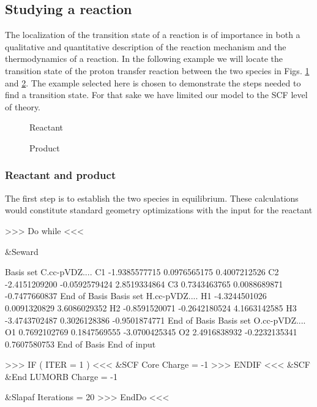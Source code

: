 \subsection{Studying a reaction}

The localization of the transition state of a reaction is of importance 
in both a qualitative and quantitative description of the reaction mechanism and
the thermodynamics of a reaction. 
In the following example we will locate the 
transition state of the proton transfer reaction between the two species
in Figs. \ref{fig:job0} and \ref{fig:job5}. 
The example selected here is chosen 
to demonstrate the steps needed to find a transition state. For that sake we have 
limited our model to the SCF level of theory. 

\begin{figure}[hp]
\caption{\label{fig:job0}Reactant}
\end{figure}

\begin{figure}[hp]
\caption{\label{fig:job5}Product}
\end{figure}

\subsubsection{Reactant and product}
The first step is to establish the two species in equilibrium. These calculations 
would constitute standard geometry optimizations with the input for the reactant

\begin{inputlisting}
>>> Do while <<<

 &Seward

Basis set
C.cc-pVDZ....
C1            -1.9385577715        0.0976565175        0.4007212526
C2            -2.4151209200       -0.0592579424        2.8519334864
C3             0.7343463765        0.0088689871       -0.7477660837
End of Basis
Basis set
H.cc-pVDZ....
H1            -4.3244501026        0.0091320829        3.6086029352
H2            -0.8591520071       -0.2642180524        4.1663142585
H3            -3.4743702487        0.3026128386       -0.9501874771
End of Basis
Basis set
O.cc-pVDZ....
O1             0.7692102769        0.1847569555       -3.0700425345
O2             2.4916838932       -0.2232135341        0.7607580753
End of Basis
End of input

>>> IF ( ITER = 1 ) <<<
 &SCF
Core
Charge = -1
>>> ENDIF <<<
 &SCF &End
LUMORB
Charge = -1

 &Slapaf
Iterations = 20
>>> EndDo <<<
\end{inputlisting}

